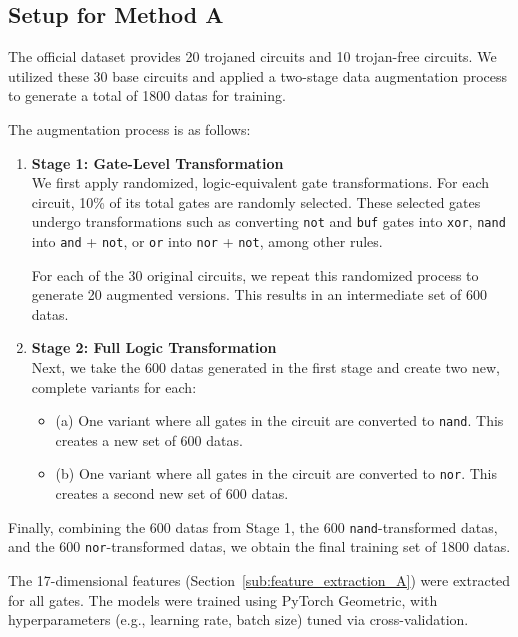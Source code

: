 \documentclass[conference]{IEEEtran}
\begin{document}
\subsection{Setup for Method A}
The official dataset provides 20 trojaned circuits and 10 trojan-free circuits. We utilized these 30 base circuits and applied a two-stage data augmentation process to generate a total of 1800 datas for training.

The augmentation process is as follows:
\begin{enumerate}
    \item \textbf{Stage 1: Gate-Level Transformation} \\
    We first apply randomized, logic-equivalent gate transformations. For each circuit, 10\% of its total gates are randomly selected. These selected gates undergo transformations such as converting \texttt{not} and \texttt{buf} gates into \texttt{xor}, \texttt{nand} into \texttt{and} + \texttt{not}, or \texttt{or} into \texttt{nor} + \texttt{not}, among other rules.
    
    For each of the 30 original circuits, we repeat this randomized process to generate 20 augmented versions. This results in an intermediate set of 600 datas.
    
    \item \textbf{Stage 2: Full Logic Transformation} \\
    Next, we take the 600 datas generated in the first stage and create two new, complete variants for each:
    \begin{itemize}
        \item (a) One variant where all gates in the circuit are converted to \texttt{nand}. This creates a new set of 600 datas.
        \item (b) One variant where all gates in the circuit are converted to \texttt{nor}. This creates a second new set of 600 datas.
    \end{itemize}
\end{enumerate}

Finally, combining the 600 datas from Stage 1, the 600 \texttt{nand}-transformed datas, and the 600 \texttt{nor}-transformed datas, we obtain the final training set of 1800 datas.

The 17-dimensional features (Section~\ref{sub:feature_extraction_A}) were extracted for all gates. The models were trained using PyTorch Geometric, with hyperparameters (e.g., learning rate, batch size) tuned via cross-validation.
\end{document}
